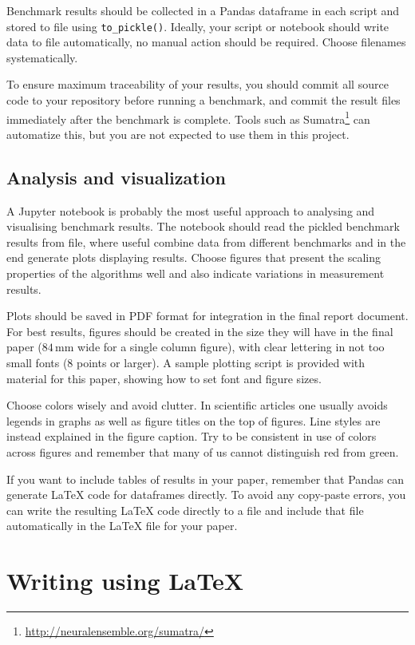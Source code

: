 \documentclass[sigconf, nonacm, natbib, screen, balance=False]{acmart}
\begin{document}
Benchmark results should be collected in a Pandas dataframe in each
script and stored to file using \verb!to_pickle()!.  Ideally, your script
or notebook should write data to file automatically, no manual action
should be required. Choose filenames systematically.

To ensure maximum traceability of your results, you should commit all
source code to your repository before running a benchmark, and commit
the result files immediately after the benchmark is complete. Tools
such as Sumatra\footnote{\url{http://neuralensemble.org/sumatra/}}
\cite{Davi_2012_48} can automatize this, but you are not expected to
use them in this project.
  
\subsection{Analysis and visualization}\label{sec:analysis}

A Jupyter notebook is probably the most useful approach to analysing
and visualising benchmark results. The notebook should read the
pickled benchmark results from file, where useful combine data from
different benchmarks and in the end generate plots displaying
results. Choose figures that present the scaling properties of the
algorithms well and also indicate variations in measurement results.

Plots should be saved in PDF format for integration in the
final report document. For best results, figures should be created in
the size they will have in the final paper ($84\,\text{mm}$ wide for a
single column figure), with clear lettering in
not too small fonts (8 points or larger). A sample plotting script is
provided with material for this paper, showing how to set font and
figure sizes.

Choose colors wisely and
avoid clutter. In scientific articles one usually avoids legends in
graphs as well as figure titles on the top of figures. Line styles are
instead explained in the figure caption. Try to be consistent in use
of colors across figures and remember that many of us cannot
distinguish red from green.

If you want to include tables of results in your paper, remember that
Pandas can generate \LaTeX{} code for dataframes directly. To avoid
any copy-paste errors, you can write the resulting \LaTeX{} code
directly to a file and include that file automatically in the \LaTeX{}
file for your paper.


\section{Writing using \LaTeX}\label{sec:tex}
\end{document}
